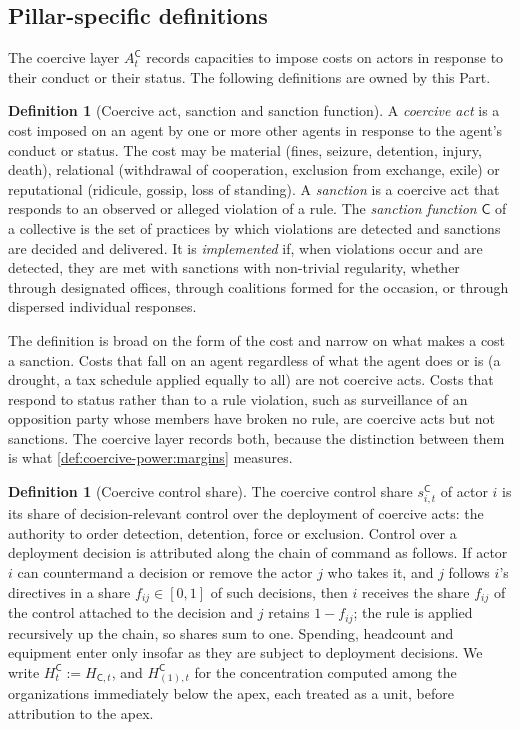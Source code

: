 \documentclass[11pt,letterpaper]{article}
\theoremstyle{definition}
\newtheorem{definition}[theorem]{Definition}
\theoremstyle{remark}
\newcommand{\pC}{\mathsf{C}}
\begin{document}
\subsection{Pillar-specific definitions}

The coercive layer $A^{\pC}_t$ records capacities to impose costs on actors in response to their conduct or their status. The following definitions are owned by this Part.

\begin{definition}[Coercive act, sanction and sanction function]
\label{def:coercive-power:sanction}
A \emph{coercive act} is a cost imposed on an agent by one or more other agents in response to the agent's conduct or status. The cost may be material (fines, seizure, detention, injury, death), relational (withdrawal of cooperation, exclusion from exchange, exile) or reputational (ridicule, gossip, loss of standing). A \emph{sanction} is a coercive act that responds to an observed or alleged violation of a rule. The \emph{sanction function} $\pC$ of a collective is the set of practices by which violations are detected and sanctions are decided and delivered. It is \emph{implemented} if, when violations occur and are detected, they are met with sanctions with non-trivial regularity, whether through designated offices, through coalitions formed for the occasion, or through dispersed individual responses.
\end{definition}

The definition is broad on the form of the cost and narrow on what makes a cost a sanction. Costs that fall on an agent regardless of what the agent does or is (a drought, a tax schedule applied equally to all) are not coercive acts. Costs that respond to status rather than to a rule violation, such as surveillance of an opposition party whose members have broken no rule, are coercive acts but not sanctions. The coercive layer records both, because the distinction between them is what \cref{def:coercive-power:margins} measures.

\begin{definition}[Coercive control share]
\label{def:coercive-power:share}
The coercive control share $s^{\pC}_{i,t}$ of actor $i$ is its share of decision-relevant control over the deployment of coercive acts: the authority to order detection, detention, force or exclusion. Control over a deployment decision is attributed along the chain of command as follows. If actor $i$ can countermand a decision or remove the actor $j$ who takes it, and $j$ follows $i$'s directives in a share $f_{ij} \in [0,1]$ of such decisions, then $i$ receives the share $f_{ij}$ of the control attached to the decision and $j$ retains $1 - f_{ij}$; the rule is applied recursively up the chain, so shares sum to one. Spending, headcount and equipment enter only insofar as they are subject to deployment decisions. We write $H^{\pC}_t := H_{\pC,t}$, and $H^{\pC}_{(1),t}$ for the concentration computed among the organizations immediately below the apex, each treated as a unit, before attribution to the apex.
\end{definition}
\end{document}
